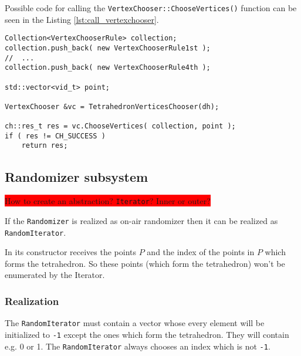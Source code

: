 Possible code for calling the \texttt{VertexChooser::ChooseVertices()} function
can be seen in the Listing \ref{lst:call_vertexchooser}.

\begin{lstlisting}[caption={Possible code for the calling the
				\texttt{VertexChooser::ChooseVertices()} function},
					label={lst:call_vertexchooser}]
Collection<VertexChooserRule> collection;
collection.push_back( new VertexChooserRule1st );
//	...
collection.push_back( new VertexChooserRule4th );

std::vector<vid_t> point;

VertexChooser &vc = TetrahedronVerticesChooser(dh);

ch::res_t res = vc.ChooseVertices( collection, point );
if ( res != CH_SUCCESS )
	return res;
\end{lstlisting}



\subsection{Randomizer subsystem}

\colorbox{red}{How to create an abstraction? \texttt{Iterator}? Inner or outer?}

If the \texttt{Randomizer} is realized as on-air randomizer then it can be
realized as \texttt{RandomIterator}.

In its constructor receives the points $P$ and the index of the points in $P$
which forms the tetrahedron. So these points (which form the tetrahedron) won't
be enumerated by the Iterator.

\subsubsection{Realization}

The \texttt{RandomIterator} must contain a vector whose every element will be
initialized to \texttt{-1} except the ones which form the tetrahedron. They will
contain e.g. 0 or 1. The \texttt{RandomIterator} always chooses an index which
is not \texttt{-1}. 







